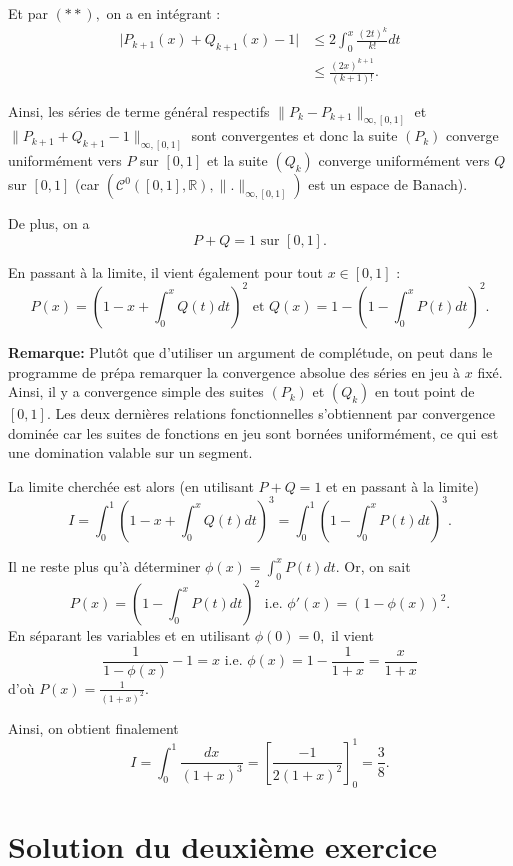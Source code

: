 Et par $(**),$ on a en intégrant :
\begin{align*}
\vert P_{k+1}(x)+Q_{k+1}(x)-1\vert & \leq 2\int_{0}^{x}\frac{(2t)^{k}}{k!}dt\\
& \leq \frac{(2x)^{k+1}}{(k+1)!}.
\end{align*}

Ainsi, les séries de terme général respectifs $\displaystyle \|P_{k}-P_{k+1}\|_{\infty,[0,1]}$ et  $\displaystyle \|P_{k+1}+Q_{k+1}-1\|_{\infty,[0,1]}$  sont convergentes et donc la suite $(P_{k})$ converge uniformément vers $P$ sur $[0,1]$ et la suite  $(Q_{k})$ converge uniformément vers $Q$ sur $[0,1]$ (car $\displaystyle \left(\mathcal{C}^{0}([0,1],\mathbb{R}),\|.\|_{\infty,[0,1]}\right)$ est un espace de Banach). 

De plus, on a $$ P+Q=1 \mbox{ sur } [0,1].$$

En passant à la limite, il vient également pour tout $x\in[0,1]$ : $$\displaystyle P(x)=\left(1-x+\int_{0}^{x}Q(t)dt\right)^{2} \mbox{ et } Q(x)=1-\left(1-\int_{0}^{x}P(t)dt\right)^{2}.$$

\textbf{Remarque: } Plutôt que d'utiliser un argument de complétude, on peut dans le programme de prépa remarquer la convergence absolue des séries en jeu à $x$ fixé. Ainsi, il y a convergence simple des suites $(P_{k})$ et $(Q_{k})$ en tout point de $[0,1].$ Les deux dernières relations fonctionnelles s'obtiennent par convergence dominée car les suites de fonctions en jeu sont bornées uniformément, ce qui est une domination valable sur un segment.

La limite cherchée est alors (en utilisant $P+Q=1$ et en passant à la limite) $$ I=\int_{0}^{1}\left(1-x+\int_{0}^{x}Q(t)dt\right)^{3}=\int_{0}^{1}\left(1-\int_{0}^{x}P(t)dt\right)^{3}.$$

Il ne reste plus qu'à déterminer $\displaystyle \phi(x)=\int_{0}^{x}P(t)dt.$
Or, on sait $$\displaystyle P(x)=\left(1-\int_{0}^{x}P(t)dt\right)^{2} \mbox{ i.e. } \phi'(x)=\left(1-\phi(x)\right)^{2}.$$
En séparant les variables et en utilisant $\phi(0)=0,$ il vient $$ \frac{1}{1-\phi(x)}-1=x \mbox{ i.e. } \phi(x)=1-\frac{1}{1+x}=\frac{x}{1+x}$$ d'où $\displaystyle P(x)=\frac{1}{(1+x)^{2}}.$

Ainsi, on obtient finalement $$ I=\int_{0}^{1}\frac{dx}{(1+x)^{3}}=\left[\frac{-1}{2(1+x)^{2}}\right]_{0}^{1}=\frac{3}{8}.$$

\section{Solution du deuxième exercice}

